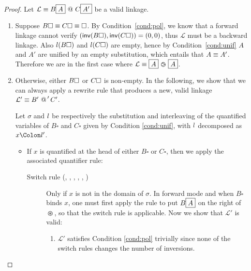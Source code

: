 \begin{proof}
  Let $\mathcal{L} \equiv B\fbox{$A$} \operatorname{\,@\,} C\fbox{$A'$}$ be a valid linkage.\\
  \begin{enumerate}
    \setlength{\itemsep}{1em}
    \item Suppose $B\square \equiv C\square \equiv \square$. By
    Condition~\ref{cond:pol}, we know that a forward linkage cannot verify
    $(\mathsf{inv}(B\square), \mathsf{inv}(C\square)) = (0,0)$, thus $\mathcal{L}$ must be a
    backward linkage. Also $l(B\square)$ and $l(C\square)$ are empty,
    hence by Condition~\ref{cond:unif} $A$ and $A'$ are unified by an empty
    substitution, which entails that $A \equiv A'$. Therefore we are in the
    first case where $\mathcal{L} \equiv \fbox{$A$} \operatorname{\,\varogreaterthan\,} \fbox{$A$}$.

    \item Otherwise, either $B\square$ or $C\square$ is non-empty. In the following,
    we show that we can always apply a rewrite rule that produces a new, valid
    linkage $\mathcal{L'} \equiv B' \operatorname{\,@\,}' C'$.
    
    Let $\sigma$ and $l$ be respectively the substitution and interleaving
    of the quantified variables of $B\square$ and $C\square$ given by Condition
    \ref{cond:unif}, with $l$ decomposed as $x \Colon \lvar'$.
    
    \begin{itemize}
      \item If $x$ is quantified at the head of either $B\square$ or $C\square$,
        then we apply the associated quantifier rule:

        \begin{description}
          \item[Switch rule (, ,
          , , ,
          )] Only if $x$ is not in the domain of $\sigma$. In
          forward mode and when $B\square$ binds $x$, one must first apply the
          rule  to put $B\fbox{$A$}$ on the right of $\operatorname{\,\varoast\,}$, so
          that the switch rule is applicable. Now we show that $\mathcal{L'}$ is
          valid:

          \begin{enumerate}
            \setlength{\itemsep}{0.8em}
            \renewcommand{\labelenumii}{\theenumii}
            \renewcommand{\theenumii}{\arabic{enumii}.}

            \item $\mathcal{L'}$ satisfies Condition \ref{cond:pol} trivially
            since none of the switch rules changes the number of inversions.


\end{enumerate}
\end{description}
\end{itemize}
\end{enumerate}
\end{proof}
